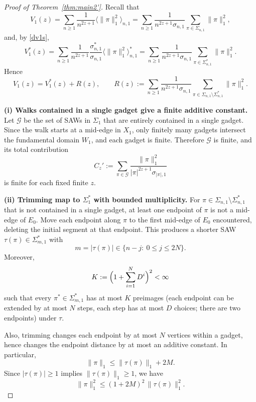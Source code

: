 \documentclass[12pt]{amsart}
\theoremstyle{plain}
\numberwithin{equation}{section}
\numberwithin{theorem}{section}
\numberwithin{figure}{section}
\begin{document}
\begin{proof}[Proof of Theorem~\ref{thm:main2'}]
Recall that
\[
V_1(z)=\sum_{n\ge1}\frac{1}{n^{2z+1}}\Big\langle \|\pi\|_1^2\Big\rangle_{n,1}
=\sum_{n\ge1}\frac{1}{n^{2z+1}\sigma_{n,1}}\sum_{\pi\in\Sigma_{n,1}}\|\pi\|_1^2,
\]
and, by \eqref{dv1s},
\[
V_1^\ast(z)=\sum_{n\ge1}\frac{1}{n^{2z+1}}\frac{\sigma_{n,1}^\ast}{\sigma_{n,1}}
\Big\langle \|\pi\|_1^2\Big\rangle_{n,1}^\ast
=\sum_{n\ge1}\frac{1}{n^{2z+1}\sigma_{n,1}}\sum_{\pi\in\Sigma_{n,1}^\ast}\|\pi\|_1^2.
\]
Hence
\begin{equation}\label{eq:V1-decomp}
V_1(z)=V_1^\ast(z)+R(z),
\qquad
R(z):=\sum_{n\ge1}\frac{1}{n^{2z+1}\sigma_{n,1}}
\sum_{\pi\in\Sigma_{n,1}\setminus\Sigma_{n,1}^\ast}\|\pi\|_1^2.
\end{equation}

\smallskip\noindent
\textbf{(i) Walks contained in a single gadget give a finite additive constant.}
Let $\mathcal{G}$ be the set of SAWs in $\Sigma_{1}$ that are entirely contained in a single
gadget. Since the walk starts at a mid-edge in $X_1$, only finitely many gadgets intersect
the fundamental domain $W_1$, and each gadget is finite. Therefore $\mathcal{G}$ is finite,
and its total contribution
\[
C_z' := \sum_{\pi\in\mathcal{G}}
\frac{\|\pi\|_1^2}{|\pi|^{2z+1}\sigma_{|\pi|,1}}
\]
is finite for each fixed finite $z$.

\smallskip\noindent
\textbf{(ii) Trimming map to $\Sigma_{1}^\ast$ with bounded multiplicity.}
 For $\pi\in\Sigma_{n,1}\setminus\Sigma_{n,1}^\ast$ that is not
contained in a single gadget, at least one endpoint of $\pi$ is not a mid-edge of $E_0$.
Move each endpoint along $\pi$ to the first mid-edge of $E_0$ encountered, deleting the
initial segment at that endpoint. This produces a shorter SAW $\tau(\pi)\in\Sigma_{m,1}^\ast$
with
\[
m=|\tau(\pi)|\in\{n-j:\ 0\le j\le 2N\}.
\]
Moreover, %
\[
K:=\Bigl(1+\sum_{i=1}^{N}D^{i}\Bigr)^2<\infty
\]
such that every $\pi^\ast\in\Sigma_{m,1}^\ast$ has at most $K$ preimages (each endpoint can be
extended by at most $N$ steps, each step has at most $D$ choices; there are two endpoints) under $\tau$.

Also, trimming changes each endpoint by at most $N$ vertices within a gadget, hence changes
the endpoint distance by at most an additive constant. In particular,
\[
\|\pi\|_1 \le \|\tau(\pi)\|_1 + 2M.
\]
Since $|\tau(\pi)|\ge 1$ implies $\|\tau(\pi)\|_1\ge 1$, we have
\begin{equation}\label{eq:dist-bound}
\|\pi\|_1^2 \le (1+2M)^2\,\|\tau(\pi)\|_1^2 .
\end{equation}


\end{proof}
\end{document}
